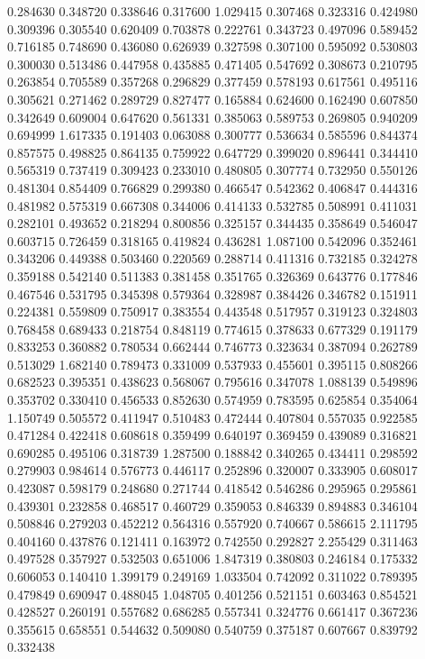 0.284630
0.348720
0.338646
0.317600
1.029415
0.307468
0.323316
0.424980
0.309396
0.305540
0.620409
0.703878
0.222761
0.343723
0.497096
0.589452
0.716185
0.748690
0.436080
0.626939
0.327598
0.307100
0.595092
0.530803
0.300030
0.513486
0.447958
0.435885
0.471405
0.547692
0.308673
0.210795
0.263854
0.705589
0.357268
0.296829
0.377459
0.578193
0.617561
0.495116
0.305621
0.271462
0.289729
0.827477
0.165884
0.624600
0.162490
0.607850
0.342649
0.609004
0.647620
0.561331
0.385063
0.589753
0.269805
0.940209
0.694999
1.617335
0.191403
0.063088
0.300777
0.536634
0.585596
0.844374
0.857575
0.498825
0.864135
0.759922
0.647729
0.399020
0.896441
0.344410
0.565319
0.737419
0.309423
0.233010
0.480805
0.307774
0.732950
0.550126
0.481304
0.854409
0.766829
0.299380
0.466547
0.542362
0.406847
0.444316
0.481982
0.575319
0.667308
0.344006
0.414133
0.532785
0.508991
0.411031
0.282101
0.493652
0.218294
0.800856
0.325157
0.344435
0.358649
0.546047
0.603715
0.726459
0.318165
0.419824
0.436281
1.087100
0.542096
0.352461
0.343206
0.449388
0.503460
0.220569
0.288714
0.411316
0.732185
0.324278
0.359188
0.542140
0.511383
0.381458
0.351765
0.326369
0.643776
0.177846
0.467546
0.531795
0.345398
0.579364
0.328987
0.384426
0.346782
0.151911
0.224381
0.559809
0.750917
0.383554
0.443548
0.517957
0.319123
0.324803
0.768458
0.689433
0.218754
0.848119
0.774615
0.378633
0.677329
0.191179
0.833253
0.360882
0.780534
0.662444
0.746773
0.323634
0.387094
0.262789
0.513029
1.682140
0.789473
0.331009
0.537933
0.455601
0.395115
0.808266
0.682523
0.395351
0.438623
0.568067
0.795616
0.347078
1.088139
0.549896
0.353702
0.330410
0.456533
0.852630
0.574959
0.783595
0.625854
0.354064
1.150749
0.505572
0.411947
0.510483
0.472444
0.407804
0.557035
0.922585
0.471284
0.422418
0.608618
0.359499
0.640197
0.369459
0.439089
0.316821
0.690285
0.495106
0.318739
1.287500
0.188842
0.340265
0.434411
0.298592
0.279903
0.984614
0.576773
0.446117
0.252896
0.320007
0.333905
0.608017
0.423087
0.598179
0.248680
0.271744
0.418542
0.546286
0.295965
0.295861
0.439301
0.232858
0.468517
0.460729
0.359053
0.846339
0.894883
0.346104
0.508846
0.279203
0.452212
0.564316
0.557920
0.740667
0.586615
2.111795
0.404160
0.437876
0.121411
0.163972
0.742550
0.292827
2.255429
0.311463
0.497528
0.357927
0.532503
0.651006
1.847319
0.380803
0.246184
0.175332
0.606053
0.140410
1.399179
0.249169
1.033504
0.742092
0.311022
0.789395
0.479849
0.690947
0.488045
1.048705
0.401256
0.521151
0.603463
0.854521
0.428527
0.260191
0.557682
0.686285
0.557341
0.324776
0.661417
0.367236
0.355615
0.658551
0.544632
0.509080
0.540759
0.375187
0.607667
0.839792
0.332438
